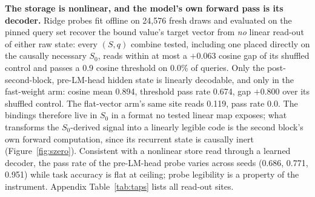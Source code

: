 \textbf{The storage is nonlinear, and the model's own forward pass is
its decoder.} Ridge probes fit offline on 24{,}576 fresh draws and evaluated
on the pinned query set recover the bound value's target vector from
\emph{no} linear read-out of either raw state: every $(S, q)$ combine
tested, including one placed directly on the causally necessary $S_0$,
reads within at most a $+0.063$ cosine gap of its shuffled control and
passes a 0.9 cosine threshold on 0.0\% of queries. %
Only the post-second-block, pre-LM-head hidden state is linearly
decodable, and only in the fast-weight arm: cosine mean 0.894, threshold
pass rate 0.674, gap $+0.800$ over its shuffled
control. %
The flat-vector arm's same site reads 0.119, pass rate
0.0. %
The bindings therefore live in $S_0$ in a format no tested linear map
exposes; what transforms the $S_0$-derived signal into a linearly
legible code is the second block's own forward computation, since its
recurrent state is causally inert (Figure~\ref{fig:szero}). Consistent
with a nonlinear store read through a learned decoder, the pass rate of
the pre-LM-head probe varies across seeds (0.686, 0.771, 0.951) while
task accuracy is flat at ceiling; %
probe legibility is a property of the instrument.
Appendix Table~\ref{tab:taps} lists all read-out sites.
